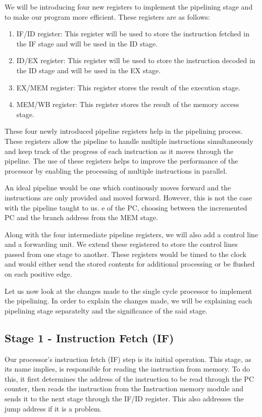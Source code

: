 \documentclass{article}
\begin{document}
We will be introducing four new registers to implement the pipelining stage and to make our program more efficient. These registers are as follows:

\begin{enumerate}
    \item IF/ID register: This register will be used to store the instruction fetched in the IF stage and will be used in the ID stage.
    \item ID/EX register: This register will be used to store the instruction decoded in the ID stage and will be used in the EX stage.
    \item EX/MEM register: This register stores the result of the execution stage.
    \item MEM/WB register: This register stores the result of the memory access stage.
\end{enumerate}

These four newly introduced pipeline registers help in the pipelining process. These registers allow the pipeline to handle multiple instructions simultaneously and keep track of the progress of each instruction as it moves through the pipeline. The use of these registers helps to improve the performance of the processor by enabling the processing of multiple instructions in parallel.

An ideal pipeline would be one which continously moves forward and the instructions are only provided and moved forward. However, this is not the case with the pipeline taught to us. e of the PC, choosing between the
incremented PC and the branch address from the MEM stage. 

Along with the four intermediate pipeline registers, we will also add a control line and a forwarding unit. We extend these registered to store the control lines passed from one stage to another. These registers would be timed to the clock and would either send the stored contents for additional processing or be flushed on each positive edge.

Let us now look at the changes made to the single cycle processor to implement the pipelining. In order to explain the changes made, we will be explaining each pipelining stage separatelty and the significance of the said stage. 

\subsection{Stage 1 - Instruction Fetch (IF)}

Our processor's instruction fetch (IF) step is its initial operation. This stage, as its name implies, is responsible for reading the instruction from memory. To do this, it first determines the address of the instruction to be read through the PC counter, then reads the instruction from the Instruction memory module and sends it to the next stage through the IF/ID register. This also addresses the jump address if it is a problem.
\end{document}
